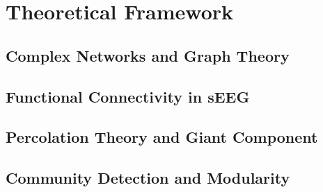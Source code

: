 \chapter{Theoretical Framework}
\label{chap:theory}

\section{Complex Networks and Graph Theory}
\lipsum[1-3]

\section{Functional Connectivity in sEEG}
\lipsum[4-6]

\section{Percolation Theory and Giant Component}
\lipsum[7-9]

\section{Community Detection and Modularity}
\lipsum[10-12]
